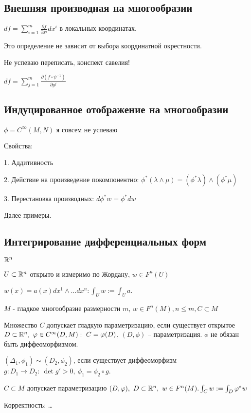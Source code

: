   \subsection*{Внешняя производная на многообразии}

  $df = \sum^m_{i=1} \frac{\partial f}{\partial x^i}dx^i$ в локальных координатах.

  Это определение не зависит от выбора координатной окрестности.

  Не успеваю переписать, конспект савелия!

  $df = \sum^m_{j=1}\frac{\partial (f\circ \psi^{-1})}{\partial y^j}$

  \subsection*{Индуцированное отображение на многообразии}

  $\phi = C^\infty(M,N)$ я совсем не успеваю

  Свойства:

  1. Аддитивность

  2. Действие на произведение покомпонентно: $\phi^*(\lambda \land \mu) = (\phi^* \lambda)\land (\phi^*\mu)$
  
  3. Перестановка производных: $d\phi^*w = \phi^* dw$

  Далее примеры.

  \subsection*{Интегрирование дифференциальных форм}

  $\mathbb{R}^n$

  $U \subset \mathbb{R}^n$ открыто и измеримо по Жордану, $w \in F^n(U)$

  $w(x) = a(x)dx^1 \land \dotsc dx^n: \int_U w := \int_U a$.

  $M$ - гладкое многообразие размерности $m$, $w \in F^n(M), n \le m, C \subset M$

  \begin{definition}
    Множество $C$ допускает гладкую параметризацию, если существует открытое $D \subset \mathbb{R}^n,\ \varphi \in C^\infty(D, M):\ C = \varphi(D)$, $(D, \phi)$ -- параметризация. $\phi$ не обязан быть диффеоморфизмом.
  \end{definition}
  \begin{definition}
    $(\Delta_1, \phi_1) \sim (D_2, \phi_2)$, если существует диффеоморфизм $g: D_1 \to D_2: \ \det g' > 0, \ \phi_1 = \phi_2 \circ g$.
  \end{definition}
  \begin{definition}
    $C\subset M$ допускает параметризацию $(D, \varphi), \ D \subset \mathbb{R}^n, \ w \in F^n(M).\\ \int_C w := \int_D \varphi^*w$
  \end{definition}
  Корректность: \dots
  
